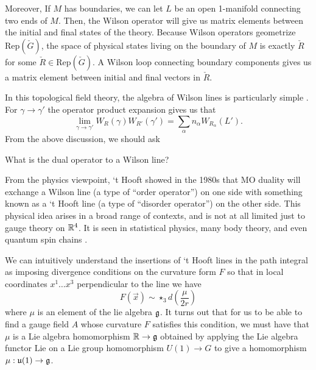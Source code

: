 	Moreover, If $M$ has boundaries, we can let $L$ be an open 1-manifold connecting two ends of $M$. Then, the Wilson operator will give us matrix elements between the initial and final states of the theory. Because Wilson operators geometrize $\mathrm{Rep}(\check G)$, the space of physical states living on the boundary of $M$ is exactly $\check R$ for some $\check R \in \mathrm{Rep}(\check G)$. A Wilson loop connecting boundary components gives us a matrix element between initial and final vectors in $\check R$.
	
	In this topological field theory, the algebra of Wilson lines is particularly simple \cite{kapustin2006}. For $\gamma \to \gamma'$ the operator product expansion gives us that
		\begin{equation}
			\lim_{\gamma \to \gamma'} W_R (\gamma) W_{R'} (\gamma') = \sum_\alpha n_\alpha W_{R_\alpha}(L').
		\end{equation}
	From the above discussion, we should ask 
	\begin{ques}
		What is the dual operator to a Wilson line?
	\end{ques}
	From the physics viewpoint, `t Hooft showed in the 1980s that MO duality will exchange a Wilson line (a type of ``order operator'') on one side with something known as a `t Hooft line (a type of ``disorder operator'') on the other side. This physical idea arises in a broad range of contexts, and is not at all limited just to gauge theory on $\rr^4$. It is seen in statistical physics, many body theory, and even quantum spin chains \cite{kardar2007}.
	
	We can intuitively understand the insertions of `t Hooft lines in the path integral as imposing divergence conditions on the curvature form $F$ so that in local coordinates $x^1 \dots x^3$ perpendicular to the line we have
		\begin{equation}\label{eq:Amod}
			F(\vec{x}) \sim \star_3 d\left( \frac{\mu}{2r} \right)
		\end{equation}
		where $\mu$ is an element of the lie algebra $\frak g$. It turns out that for us to be able to find a gauge field $A$ whose curvature $F$ satisfies this condition, we must have that $\mu$ is a Lie algebra homomorphism $\mathbb R \to \frak g$ obtained by applying the Lie algebra functor $\mathrm{Lie}$ on a Lie group homomorphism $U(1) \to G$ to give a homomorphism $\mu: \frak u(1) \to \gg$.
		
